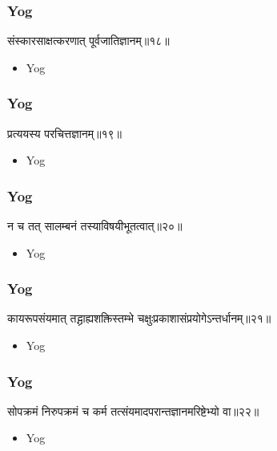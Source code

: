 \begin{frame}[fragile]\frametitle{Yog}
\begin{sanskrit}
संस्कारसाक्षत्करणात् पूर्वजातिज्ञानम्॥१८॥
\end{sanskrit}
	\begin{itemize}
	\item Yog 
	\end{itemize}
\end{frame}

\begin{frame}[fragile]\frametitle{Yog}
\begin{sanskrit}
प्रत्ययस्य परचित्तज्ञानम्॥१९॥
\end{sanskrit}
	\begin{itemize}
	\item Yog 
	\end{itemize}
\end{frame}


\begin{frame}[fragile]\frametitle{Yog}
\begin{sanskrit}
न च तत् सालम्बनं तस्याविषयीभूतत्वात्॥२०॥
\end{sanskrit}
	\begin{itemize}
	\item Yog 
	\end{itemize}
\end{frame}

\begin{frame}[fragile]\frametitle{Yog}
\begin{sanskrit}
कायरूपसंयमात् तद्ग्राह्यशक्तिस्तम्भे चक्षुःप्रकाशासंप्रयोगेऽन्तर्धानम्॥२१॥
\end{sanskrit}
	\begin{itemize}
	\item Yog 
	\end{itemize}
\end{frame}

\begin{frame}[fragile]\frametitle{Yog}
\begin{sanskrit}
सोपक्रमं निरुपक्रमं च कर्म तत्संयमादपरान्तज्ञानमरिष्टेभ्यो वा॥२२॥
\end{sanskrit}
	\begin{itemize}
	\item Yog 
	\end{itemize}
\end{frame}

